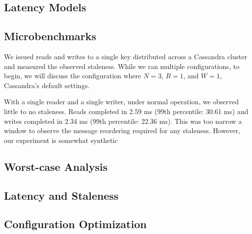 \documentclass{vldb}
\begin{document}
\subsection{Latency Models}
\label{sec:latencies}



\subsection{Microbenchmarks}

We issued reads and writes to a single key distributed across a
Cassandra cluster and measured the observed staleness.  While we ran
multiple configurations, to begin, we will discuss the configuration
where $N=3$, $R=1$, and $W=1$, Cassandra's default settings.

With a single reader and a single writer, under normal operation, we
observed little to no staleness.  Reads completed in 2.59 ms (99th
percentile: 30.61 ms) and writes completed in 2.34 ms (99th
percentile: 22.36 ms).  This was too narrow a window to observe the
message reordering required for any staleness.  However, our experiment is somewhat synthetic



\subsection{Worst-case Analysis}

\subsection{Latency and Staleness}

\subsection{Configuration Optimization}
\end{document}
